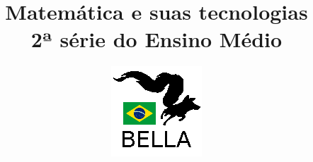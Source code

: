 \documentclass{book}
\begin{document}
\title{Matemática e suas tecnologias \\
2ª série do Ensino Médio}
\author{\includegraphics{../../logos/128x128-brazil.png}}

\maketitle

\tableofcontents







\end{document}
